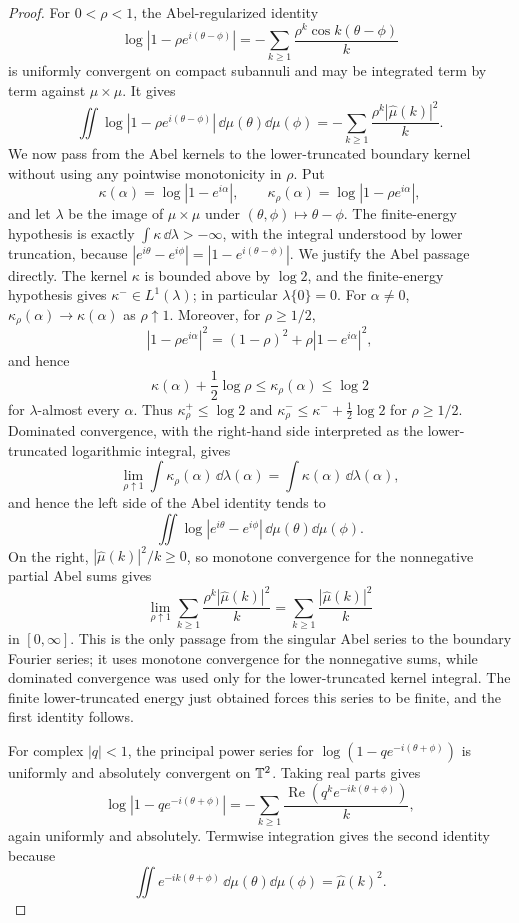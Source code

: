 \begin{proof}
For \(0<\rho<1\), the Abel-regularized identity
\[
\log|1-\rho e^{i(\theta-\phi)}|
=-\sum_{k\ge1}\frac{\rho^k\cos k(\theta-\phi)}{k}
\]
is uniformly convergent on compact subannuli and may be integrated term by term against \(\mu\times\mu\).  It gives
\[
\iint\log|1-\rho e^{i(\theta-\phi)}|\,\dd\mu(\theta)\dd\mu(\phi)
=-
\sum_{k\ge1}\frac{\rho^k|\widehat\mu(k)|^2}{k}.
\]
We now pass from the Abel kernels to the lower-truncated boundary kernel without using any pointwise monotonicity in \(\rho\).  Put
\[
\kappa(\alpha)=\log|1-e^{i\alpha}|,
\qquad
\kappa_\rho(\alpha)=\log|1-\rho e^{i\alpha}|,
\]
and let \(\lambda\) be the image of \(\mu\times\mu\) under
\((\theta,\phi)\mapsto\theta-\phi\).  The finite-energy hypothesis is exactly
\(\int\kappa\,\dd\lambda>-\infty\), with the integral understood by lower truncation, because
\(|e^{i\theta}-e^{i\phi}|=|1-e^{i(\theta-\phi)}|\).  We justify the Abel passage directly.  The kernel \(\kappa\) is bounded above by \(\log 2\), and the finite-energy hypothesis gives \(\kappa^-\in L^1(\lambda)\); in particular \(\lambda\{0\}=0\).  For \(\alpha\ne0\), \(\kappa_\rho(\alpha)\to\kappa(\alpha)\) as \(\rho\uparrow1\).  Moreover, for \(\rho\ge1/2\),
\[
|1-\rho e^{i\alpha}|^2=(1-\rho)^2+\rho|1-e^{i\alpha}|^2,
\]
and hence
\[
\kappa(\alpha)+\frac12\log\rho\le \kappa_\rho(\alpha)\le \log2
\]
for \(\lambda\)-almost every \(\alpha\).  Thus \(\kappa_\rho^+\le\log2\) and \(\kappa_\rho^-\le \kappa^-+\frac12\log2\) for \(\rho\ge1/2\).  Dominated convergence, with the right-hand side interpreted as the lower-truncated logarithmic integral, gives
\[
\lim_{\rho\uparrow1}\int\kappa_\rho(\alpha)\,\dd\lambda(\alpha)
=\int\kappa(\alpha)\,\dd\lambda(\alpha),
\]
and hence the left side of the Abel identity tends to
\[
\iint\log|e^{i\theta}-e^{i\phi}|\,\dd\mu(\theta)\dd\mu(\phi).
\]
On the right, \(|\widehat\mu(k)|^2/k\ge0\), so monotone convergence for the nonnegative partial Abel sums gives
\[
\lim_{\rho\uparrow1}
\sum_{k\ge1}\frac{\rho^k|\widehat\mu(k)|^2}{k}
=
\sum_{k\ge1}\frac{|\widehat\mu(k)|^2}{k}
\]
in \([0,\infty]\).  This is the only passage from the singular Abel
series to the boundary Fourier series; it uses monotone convergence for
the nonnegative sums, while dominated convergence was used only for the
lower-truncated kernel integral.  The finite lower-truncated energy just
obtained forces this series to be finite, and the first identity follows.

For complex \(|q|<1\), the principal power series for
\(\log(1-qe^{-i(\theta+\phi)})\) is uniformly and absolutely convergent
on \(\mathbb{T}^2\).  Taking real parts gives
\[
\log|1-qe^{-i(\theta+\phi)}|
=-\sum_{k\ge1}\frac{\operatorname{Re}\!\left(q^k e^{-ik(\theta+\phi)}\right)}{k},
\]
again uniformly and absolutely.  Termwise integration gives the second
identity because
\[
\iint e^{-ik(\theta+\phi)}\,\dd\mu(\theta)\dd\mu(\phi)
=\widehat\mu(k)^2.
\]
\end{proof}



